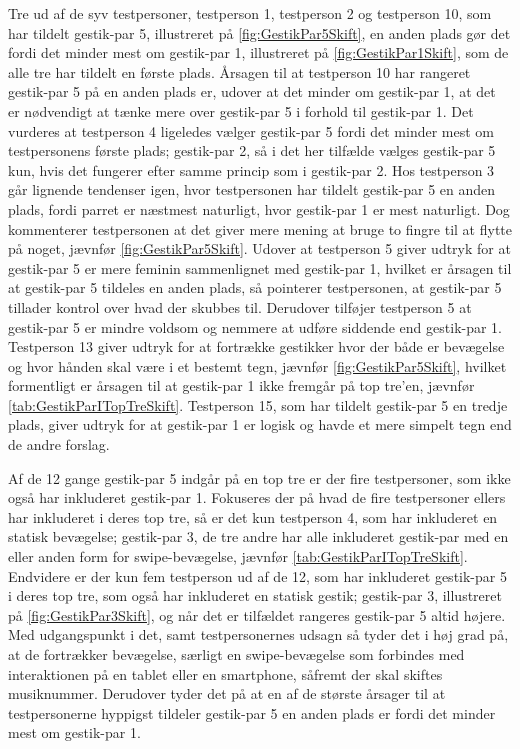 Tre ud af de syv testpersoner, testperson 1, testperson 2 og testperson 10, som har tildelt gestik-par 5, illustreret på \autoref{fig:GestikPar5Skift}, en anden plads gør det fordi det minder mest om gestik-par 1, illustreret på \autoref{fig:GestikPar1Skift}, som de alle tre har tildelt en første plads. Årsagen til at testperson 10 har rangeret gestik-par 5 på en anden plads er, udover at det minder om gestik-par 1, at det er nødvendigt at tænke mere over gestik-par 5 i forhold til gestik-par 1. Det vurderes at testperson 4 ligeledes vælger gestik-par 5 fordi det minder mest om testpersonens første plads; gestik-par 2, så i det her tilfælde vælges gestik-par 5 kun, hvis det fungerer efter samme princip som i gestik-par 2. Hos testperson 3 går lignende tendenser igen, hvor testpersonen har tildelt gestik-par 5 en anden plads, fordi parret er næstmest naturligt, hvor gestik-par 1 er mest naturligt. Dog kommenterer testpersonen at det giver mere mening at bruge to fingre til at flytte på noget, jævnfør \autoref{fig:GestikPar5Skift}. Udover at testperson 5 giver udtryk for at gestik-par 5 er mere feminin sammenlignet med gestik-par 1, hvilket er årsagen til at gestik-par 5 tildeles en anden plads, så pointerer testpersonen, at gestik-par 5 tillader kontrol over hvad der skubbes til. Derudover tilføjer testperson 5 at gestik-par 5 er mindre voldsom og nemmere at udføre siddende end gestik-par 1. Testperson 13 giver udtryk for at fortrække gestikker hvor der både er bevægelse og hvor hånden skal være i et bestemt tegn, jævnfør \autoref{fig:GestikPar5Skift}, hvilket formentligt er årsagen til at gestik-par 1 ikke fremgår på top tre'en, jævnfør \autoref{tab:GestikParITopTreSkift}. Testperson 15, som har tildelt gestik-par 5 en tredje plads, giver udtryk for at gestik-par 1 er logisk og havde et mere simpelt tegn end de andre forslag. 

Af de 12 gange gestik-par 5 indgår på en top tre er der fire testpersoner, som ikke også har inkluderet gestik-par 1. Fokuseres der på hvad de fire testpersoner ellers har inkluderet i deres top tre, så er det kun testperson 4, som har inkluderet en statisk bevægelse; gestik-par 3, de tre andre har alle inkluderet gestik-par med en eller anden form for swipe-bevægelse, jævnfør \autoref{tab:GestikParITopTreSkift}. Endvidere er der kun fem testperson ud af de 12, som har inkluderet gestik-par 5 i deres top tre, som også har inkluderet en statisk gestik; gestik-par 3, illustreret på \autoref{fig:GestikPar3Skift}, og når det er tilfældet rangeres gestik-par 5 altid højere. Med udgangspunkt i det, samt testpersonernes udsagn så tyder det i høj grad på, at de fortrækker bevægelse, særligt en swipe-bevægelse som forbindes med interaktionen på en tablet eller en smartphone, såfremt der skal skiftes musiknummer. Derudover tyder det på at en af de største årsager til at testpersonerne hyppigst tildeler gestik-par 5 en anden plads er fordi det minder mest om gestik-par 1.
%
